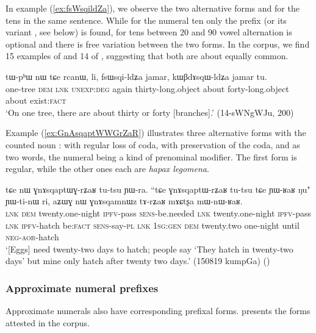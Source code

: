 In example (\ref{ex:fsWsqildZa}), we observe the two alternative forms  and  for the tens in the same sentence. While for the numeral ten only the prefix  (or its variant , see  below) is found, for tens between 20 and 90 vowel alternation is optional and there is free variation between the two forms. In the corpus, we find 15 examples of  and 14 of  , suggesting that both are about equally common.

\begin{exe}
\ex \label{ex:fsWsqildZa}
\gll tɯ-pʰɯ nɯ tɕe rcanɯ, li, fsɯsqi-ldʑa jamar, kɯβdɤsqɯ-ldʑa jamar tu. \\
one-tree \textsc{dem} \textsc{lnk} \textsc{unexp}:\textsc{deg} again thirty-long.object about forty-long.object about exist:\textsc{fact} \\
\glt `On one tree, there are about thirty or forty [branches].'   (14-sWNgWJu, 200)
\end{exe}

Example (\ref{ex:GnAsqaptWWGrZaR}) illustrates three alternative forms with the counted noun :  with regular loss of coda,  with preservation of the coda,   and   as two words, the numeral being a kind of prenominal modifier. The first form is regular, while the other ones each are \textit{hapax legomena}.

\begin{exe}
\ex \label{ex:GnAsqaptWWGrZaR}
\gll  tɕe nɯ ɣnɤsqaptɯɣ-rʑaʁ tu-tsu ɲɯ-ra. ``tɕe ɣnɤsqaptɯ-rʑaʁ tu-tsu tɕe ɲɯ-ʁaʁ ŋu" ɲɯ-ti-nɯ ri, aʑɯɣ nɯ ɣnɤsqamnɯz tɤ-rʑaʁ mɤɕtʂa mɯ-nɯ-ʁaʁ. \\
\textsc{lnk} \textsc{dem} twenty.one-night \textsc{ipfv}-pass \textsc{sens}-be.needed  
\textsc{lnk}  twenty.one-night \textsc{ipfv}-pass  \textsc{lnk} \textsc{ipfv}-hatch be:\textsc{fact} \textsc{sens}-say-\textsc{pl} \textsc{lnk} \textsc{1sg}:\textsc{gen} \textsc{dem} twenty.two one-night until \textsc{neg}-\textsc{aor}-hatch \\
\glt `[Eggs] need twenty-two days to hatch; people say `They hatch in twenty-two days' but mine only hatch after twenty two days.' (150819 kumpGa)
()
\end{exe}


\subsubsection{Approximate numeral prefixes} \label{sec:approximate.numeral.prefixes}
Approximate numerals also have corresponding prefixal forms.  presents the forms attested in the corpus.

